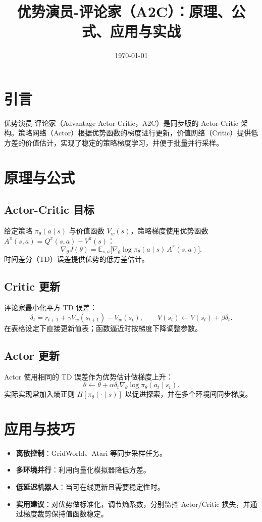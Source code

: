 \documentclass[UTF8,zihao=-4]{ctexart}
\title{优势演员-评论家（A2C）：原理、公式、应用与实战}
\author{}
\date{\today}
\begin{document}
\maketitle

\section{引言}
优势演员-评论家（Advantage Actor-Critic，A2C）是同步版的 Actor-Critic 架构。策略网络（Actor）根据优势函数的梯度进行更新，价值网络（Critic）提供低方差的价值估计，实现了稳定的策略梯度学习，并便于批量并行采样。

\section{原理与公式}
\subsection{Actor-Critic 目标}
给定策略 \(\pi_\theta(a\mid s)\) 与价值函数 \(V_w(s)\)，策略梯度使用优势函数 \(A^{\pi}(s,a) = Q^{\pi}(s,a) - V^{\pi}(s)\)：
\begin{equation}
\nabla_\theta J(\theta) = \mathbb{E}_{s,a}\big[ \nabla_\theta \log \pi_\theta(a\mid s)\, A^{\pi}(s,a) \big].
\end{equation}
时间差分（TD）误差提供优势的低方差估计。

\subsection{Critic 更新}
评论家最小化平方 TD 误差：
\begin{equation}
\delta_t = r_{t+1} + \gamma V_w(s_{t+1}) - V_w(s_t), \qquad V(s_t) \leftarrow V(s_t) + \beta \delta_t.
\end{equation}
在表格设定下直接更新值表；函数逼近时按梯度下降调整参数。

\subsection{Actor 更新}
Actor 使用相同的 TD 误差作为优势估计做梯度上升：
\begin{equation}
\theta \leftarrow \theta + \alpha \delta_t \nabla_\theta \log \pi_\theta(a_t\mid s_t).
\end{equation}
实际实现常加入熵正则 \(H[\pi_\theta(\cdot\mid s)]\) 以促进探索，并在多个环境间同步梯度。

\section{应用与技巧}
\begin{itemize}
  \item \textbf{离散控制}：GridWorld、Atari 等同步采样任务。
  \item \textbf{多环境并行}：利用向量化模拟器降低方差。
  \item \textbf{低延迟机器人}：当可在线更新且需要稳定性时。
  \item \textbf{实用建议}：对优势做标准化，调节熵系数，分别监控 Actor/Critic 损失，并通过梯度裁剪保持值函数稳定。
\end{itemize}
\end{document}
